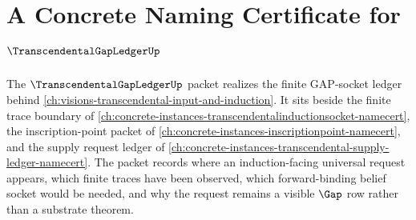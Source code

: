 \chapter{A Concrete Naming Certificate for $\TranscendentalGapLedgerUp$}
\label{ch:concrete-instances-transcendental-gap-ledger-namecert}

The $\TranscendentalGapLedgerUp$ packet realizes the finite GAP-socket ledger behind \autoref{ch:visions-transcendental-input-and-induction}. It sits beside the finite trace boundary of \autoref{ch:concrete-instances-transcendentalinductionsocket-namecert}, the inscription-point packet of \autoref{ch:concrete-instances-inscriptionpoint-namecert}, and the supply request ledger of \autoref{ch:concrete-instances-transcendental-supply-ledger-namecert}. The packet records where an induction-facing universal request appears, which finite traces have been observed, which forward-binding belief socket would be needed, and why the request remains a visible $\Gap$ row rather than a substrate theorem.

